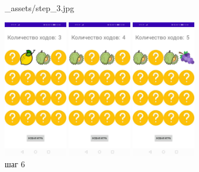 \documentclass[12pt, a4paper, simple]{eskdtext}
\begin{document}
\begin{figure}[!h]
\begin{minipage}{0.15\textwidth}
                {_assets/step_3.jpg}
            \caption{шаг 3}
            \label{fig:step_3}
        \end{minipage}
        \begin{minipage}{0.15\textwidth}
            \centering
            \includegraphics[height=6cm]
                {_assets/step_4.jpg}
            \caption{шаг 4}
            \label{fig:step_4}
        \end{minipage}
        \begin{minipage}{0.15\textwidth}
            \centering
            \includegraphics[height=6cm]
                {_assets/step_5.jpg}
            \caption{шаг 5}
            \label{fig:step_5}
        \end{minipage}
        \begin{minipage}{0.15\textwidth}
            \centering
            \includegraphics[height=6cm]
                {_assets/step_6.jpg}
            \caption{шаг 6}
            \label{fig:step_6}
        \end{minipage}
    \end{figure}
\end{document}
